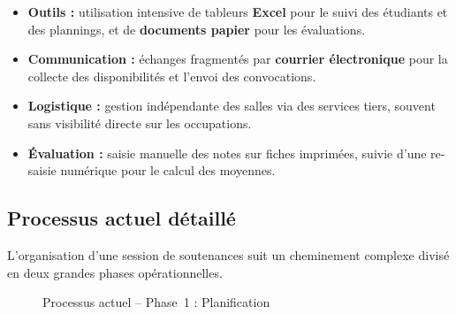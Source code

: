 \documentclass[12pt,a4paper]{article}
\begin{document}
\begin{itemize}[label=\textcolor{primary}{\textbullet}]
    \item \textbf{Outils :} utilisation intensive de tableurs \textbf{Excel}
          pour le suivi des étudiants et des plannings, et de \textbf{documents
              papier} pour les évaluations.
    \item \textbf{Communication :} échanges fragmentés par \textbf{courrier
              électronique} pour la collecte des disponibilités et l'envoi des
          convocations.
    \item \textbf{Logistique :} gestion indépendante des salles via des services
          tiers, souvent sans visibilité directe sur les occupations.
    \item \textbf{Évaluation :} saisie manuelle des notes sur fiches imprimées,
          suivie d'une re-saisie numérique pour le calcul des moyennes.
\end{itemize}

\subsection{Processus actuel détaillé}
\label{subsec:processus_actuel}

L'organisation d'une session de soutenances suit un cheminement complexe divisé
en deux grandes phases opérationnelles.

\begin{figure}[H]
    \centering
    \caption{Processus actuel -- Phase~1 : Planification}
    \label{fig:processus_actuel_phase1}
\end{figure}
\end{document}
